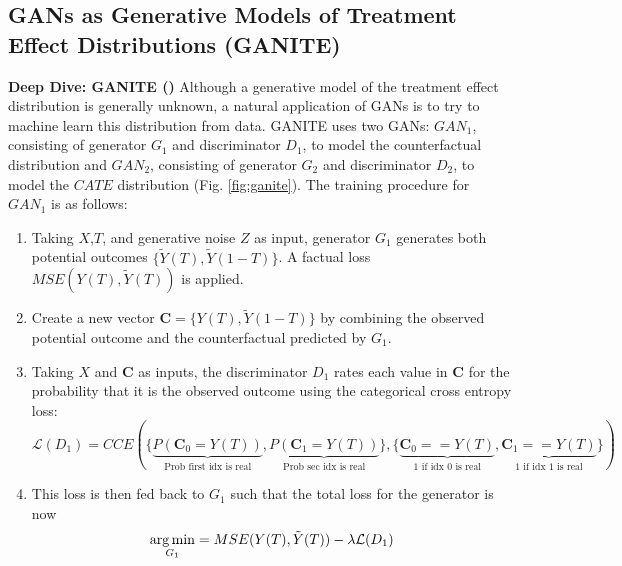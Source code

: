 \subsection{GANs as Generative Models of Treatment Effect Distributions (GANITE)}
\textbf{Deep Dive: GANITE (\citet{Yoon2018})}
Although a generative model of the treatment effect distribution is generally unknown, a natural application of GANs is to try to machine learn this distribution from data. GANITE uses two GANs: $GAN_1$, consisting of generator $G_1$ and discriminator $D_1$, to model the counterfactual distribution and $GAN_2$, consisting of generator $G_2$ and discriminator $D_2$, to model the $CATE$ distribution \citep{Yoon2018} (Fig. \ref{fig:ganite}).
The training procedure for $GAN_1$ is as follows:
\begin{enumerate}
\singlespacing
    \item Taking $X$,$T$, and generative noise $Z$ as input, generator $G_1$ generates both potential outcomes $\{\tilde{Y}(T),\tilde{Y}(1-T)\}$. A factual loss $MSE(Y(T),\tilde{Y}(T))$ is applied.
    \item Create a new vector $\textbf{C}=\{Y(T),\tilde{Y}(1-T)\}$ by combining the observed potential outcome and the counterfactual predicted by $G_1$.
    \item Taking $X$ and $\textbf{C}$ as inputs, the discriminator $D_1$ rates each value in $\textbf{C}$ for the probability that it is the observed outcome using the categorical cross entropy loss:
    \begin{equation}
    \mathcal{L}(D_1)=CCE(\{\underbrace{P(\textbf{C}_0=Y(T))}_{\text{Prob first idx is real}},\underbrace{P(\textbf{C}_1=Y(T))}_{\text{Prob sec idx is real}}\},\{\underbrace{\textbf{C}_0==Y(T)}_{\text{1 if idx 0 is real}},\underbrace{\textbf{C}_1==Y(T)}_{\text{1 if idx 1 is real}}\})
\end{equation}
    \item This loss is then fed back to $G_1$ such that the total loss for the generator is now  
    \begin{equation}
        \operatorname*{arg\,min}_{G_1}=MSE(Y(T),\tilde{Y}(T)) - \lambda \mathcal{L}(D_1)
    \end{equation}
\end{enumerate}

